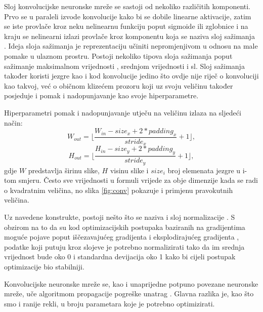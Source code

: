 \documentclass[times, utf8, diplomski]{fer}
\begin{document}
Sloj konvolucijske neuronske mreže se sastoji od nekoliko različitih komponenti. Prvo se u paraleli izvode konvolucije kako bi se dobile linearne aktivacije, zatim se iste provlače kroz neku nelinearnu funkciju poput sigmoide ili zglobnice  i na kraju se nelinearni izlazi provlače kroz komponentu koja se naziva sloj sažimanja . Ideja sloja sažimanja je reprezentaciju učiniti nepromjenjivom  u odnosu na male pomake u ulaznom prostru. Postoji nekoliko tipova sloja sažimanja poput sažimanje maksimalnom vrijednosti , srednjom vrijednosti  i sl. Sloj sažimanja također koristi jezgre kao i kod konvolucije jedino što ovdje nije riječ o konvoluciji kao takvoj, već o običnom klizećem prozoru koji uz svoju veličinu također posjeduje i pomak i nadopunjavanje kao svoje hiperparametre.

Hiperparametri pomak i nadopunjavanje utječu na veličinu izlaza na sljedeći način:
\begin{equation}
    W_{out} = \lfloor \frac{W_{in} - size_x + 2 * padding_x}{stride_x} + 1 \rfloor,
\end{equation}
\begin{equation}
    H_{out} = \lfloor \frac{H_{in} - size_y + 2 * padding_y}{stride_y} + 1 \rfloor,
\end{equation}
gdje $W$ predstavlja širinu  slike, $H$ visinu  slike i $size_i$ broj elemenata jezgre u i-tom smjeru. Često sve vrijednosti u formuli vrijede za obje dimenzije kada se radi o kvadratnim veličina, no slika \ref{fig:conv} pokazuje i primjenu pravokutnih veličina.

Uz navedene konstrukte, postoji nešto što se naziva i sloj normalizacije . S obzirom na to da su kod optimizacijskih postupaka baziranih na gradijentima moguće pojave poput iščezavajućeg gradijenta  i eksplodirajućeg gradijenta , podatke koji putuju kroz slojeve je potrebno normalizirati tako da im srednja vrijednost  bude oko 0 i standardna devijacija  oko 1 kako bi cijeli postupak optimizacije bio stabilniji.

Konvolucijske neuronske mreže se, kao i unaprijedne potpuno povezane neuronske mreže, uče algoritmom propagacije pogreške unatrag . Glavna razlika je, kao što smo i ranije rekli, u broju parametara koje je potrebno optimizirati.
\end{document}
